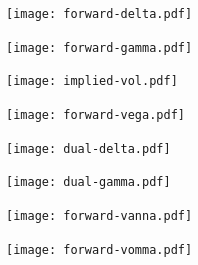 \documentclass[custom, plainsections]{sciposter}
\begin{document}
\begin{multicols*}{3}
\setlength\columnseprule{0pt}

\texttt{[image: forward-delta.pdf]}

\texttt{[image: forward-gamma.pdf]}

\texttt{[image: implied-vol.pdf]}

\texttt{[image: forward-vega.pdf]}

\texttt{[image: dual-delta.pdf]}

\texttt{[image: dual-gamma.pdf]}

\texttt{[image: forward-vanna.pdf]}

\texttt{[image: forward-vomma.pdf]}

\vspace{10cm}

\end{multicols*}
\pagebreak
\end{document}
